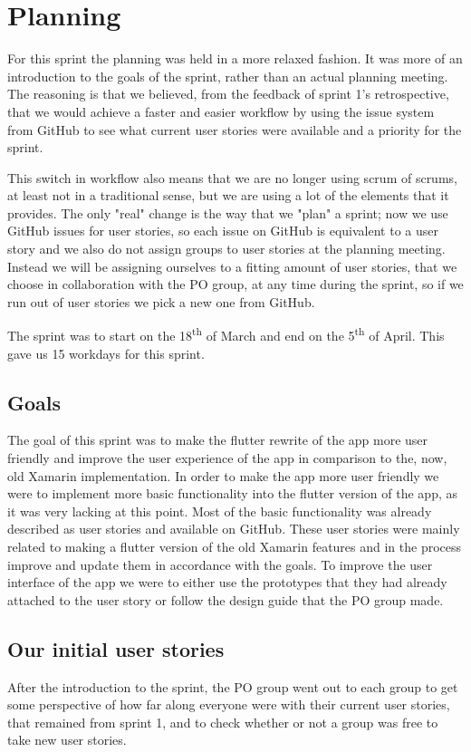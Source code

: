 \section{Planning}
For this sprint the planning was held in a more relaxed fashion.
It was more of an introduction to the goals of the sprint, rather than an actual planning meeting.
The reasoning is that we believed, from the feedback of sprint 1's retrospective, that we would achieve a faster and easier workflow by using the issue system from GitHub to see what current user stories were available and a priority for the sprint. 

This switch in workflow also means that we are no longer using scrum of scrums, at least not in a traditional sense, but we are using a lot of the elements that it provides.
The only "real" change is the way that we "plan" a sprint; now we use GitHub issues for user stories, so each issue on GitHub is equivalent to a user story and we also do not assign groups to user stories at the planning meeting. 
Instead we will be assigning ourselves to a fitting amount of user stories, that we choose in collaboration with the PO group, at any time during the sprint, so if we run out of user stories we pick a new one from GitHub. 

The sprint was to start on the 18\textsuperscript{th} of March and end on the 5\textsuperscript{th} of April. This gave us 15 workdays for this sprint.

\subsection{Goals}
The goal of this sprint was to make the flutter rewrite of the app more user friendly and improve the user experience of the app in comparison to the, now, old Xamarin implementation.
In order to make the app more user friendly we were to implement more basic functionality into the flutter version of the app, as it was very lacking at this point.
Most of the basic functionality was already described as user stories and available on GitHub. 
These user stories were mainly related to making a flutter version of the old Xamarin features and in the process improve and update them in accordance with the goals.
To improve the user interface of the app we were to either use the prototypes that they had already attached to the user story or follow the design guide that the PO group made.

\subsection{Our initial user stories} \label{sprint2planstories}
After the introduction to the sprint, the PO group went out to each group to get some perspective of how far along everyone were with their current user stories, that remained from sprint 1, and to check whether or not a group was free to take new user stories.

